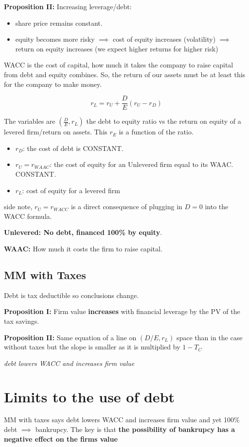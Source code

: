 \documentclass{article}
\begin{document}
\textbf{Proposition II: }
Increasing leverage/debt:
\begin{itemize}
\item share price remains constant.
\item equity becomes more risky  $\implies$ cost of equity increases (volatility) $\implies$ return on equity increases (we expect higher returns for higher risk)
\end{itemize}

WACC is the cost of capital, how much it takes the company to raise capital from debt and equity combines. So, the return of our assets must be at least this for the company to make money. 

\[ r_L = r_U + \frac{D}{E}(r_U - r_D) \]

The variables are $(\frac{D}{E}, r_L)$ the debt to equity ratio vs the return on equity of a levered firm/return on assets. This $r_E$ is a function of the ratio. 

\begin{itemize}
\item $r_D$: the cost of debt is CONSTANT. 
\item $r_U = r_{WAAC}$: the cost of equity for an Unlevered firm equal to its WAAC. CONSTANT.
\item $r_L$: cost of equity for a levered firm
\end{itemize}

side note, $r_U =  r_{WACC}$ is a direct consequence of plugging in $D = 0$ into the WACC formula.

\textbf{Unlevered: No debt, financed 100\% by equity}. 

\textbf{WAAC:} How much it costs the firm to raise capital.

\subsection{MM with Taxes}
Debt is tax deductible so conclusions change. 

\textbf{Proposition I:} Firm value \textbf{increases} with financial leverage by the PV of the tax savings.

\textbf{Proposition II:} Same equation of a line on $(D/E, r_L)$ space than in the case without taxes but the slope is smaller as it is multiplied by $1-T_C$

\textit{debt lowers WACC and increases firm value}

\section{Limits to the use of debt}
MM with taxes says debt lowers WACC and increases firm value and yet 100\% debt $\implies$ bankrupcy. The key is that \textbf{the possibility of bankrupcy has a negative effect on the firms value}
\end{document}
